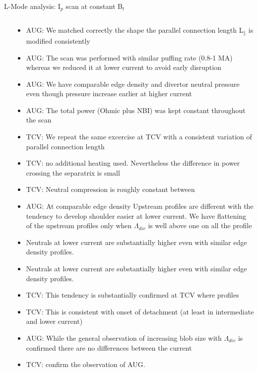 \documentclass[10pt, compress]{beamer}
\begin{document}
\begin{frame}{L-Mode analysis: I$_p$ scan at constant B$_{t}$}
\begin{columns}
\begin{column}{0.65\textwidth}
  \end{column}
  \begin{column}{0.35\textwidth}
    \begin{itemize}
      \item<1|only@1> AUG: We matched correctly the shape the parallel
        connection length L$_{\parallel}$ is modified consistently
      \item<1|only@1> AUG: The scan was performed with similar puffing rate (0.8-1
        MA) whereas we reduced it at lower current to avoid early disruption
      \item<2|only@2> AUG: We have comparable edge density and divertor neutral
        pressure even though pressure increase earlier at higher current
      \item<2|only@2> AUG: The total power (Ohmic plus NBI) was kept
        constant throughout the scan
      \item<3|only@3> TCV: We repeat the same excercise at TCV with a
        consistent variation of parallel connection length
      \item<4|only@4> TCV: no additional heating
        used. Nevertheless the difference in power crossing the separatrix
        is small
      \item<4|only@4> TCV: Neutral compression is roughly constant between
      \item<5|only@5> AUG: At comparable edge density Upstream profiles are
        different with the tendency to develop shoulder easier at
        lower current. \alert{We have flattening of the upstream
          profiles only when $\Lambda_{div}$ is well above one on all
          the profile}
        \item<6|only@6> Neutrals at lower current are substantially
          higher even with similar edge density profiles.
        \item<7|only@7> Neutrals at lower current are substantially
          higher even with similar edge density profiles.
      \item<8|only@8> TCV: This tendency is substantially confirmed at
        TCV where
        profiles  
      \item<9|only@9> TCV: This is consistent with onset of detachment
        (at least in intermediate and lower current)
      \item<10|only@10> AUG: While the general observation of increasing
        blob size with $\Lambda_{div}$ is confirmed there are no
        differences between the current
      \item<11|only@11> TCV: confirm the observation of AUG. 
      \end{itemize}
    \end{column}
\end{columns}
\end{frame}
\end{document}
